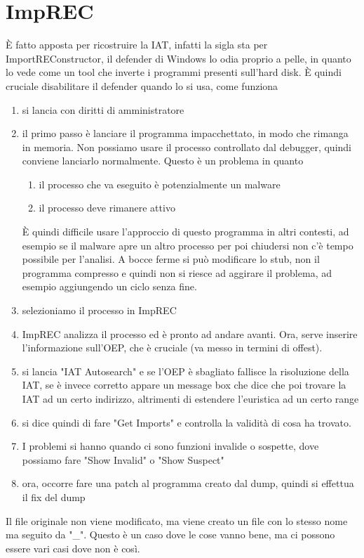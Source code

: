 \documentclass[12pt, oneside]{extbook}
\begin{document}
\section{ImpREC}
È fatto apposta per ricostruire la IAT, infatti la sigla sta per ImportREConstructor, il defender di Windows lo odia proprio a pelle, in quanto lo vede come un tool che inverte i programmi presenti sull'hard disk. È quindi cruciale disabilitare il defender quando lo si usa, come funziona
\begin{enumerate}
\item si lancia con diritti di amministratore
\item il primo passo è lanciare il programma impacchettato, in modo che rimanga in memoria. Non possiamo usare il processo controllato dal debugger, quindi conviene lanciarlo normalmente. Questo è un problema in quanto
\begin{enumerate}
\item il processo che va eseguito è potenzialmente un malware
\item il processo deve rimanere attivo
\end{enumerate}
È quindi difficile usare l'approccio di questo programma in altri contesti, ad esempio se il malware apre un altro processo per poi chiudersi non c'è tempo possibile per l'analisi. A bocce ferme si può modificare lo stub, non il programma compresso e quindi non si riesce ad aggirare il problema, ad esempio aggiungendo un ciclo senza fine.
\item selezioniamo il processo in ImpREC
\item ImpREC analizza il processo ed è pronto ad andare avanti. Ora, serve inserire l'informazione sull'OEP, che è cruciale (va messo in termini di offest).
\item si lancia "IAT Autosearch" e se l'OEP è sbagliato fallisce la risoluzione della IAT, se è invece corretto appare un message box che dice che poi trovare la IAT ad un certo indirizzo, altrimenti di estendere l'euristica ad un certo range
\item si dice quindi di fare "Get Imports" e controlla la validità di cosa ha trovato.
\item I problemi si hanno quando ci sono funzioni invalide o sospette, dove possiamo fare "Show Invalid" o "Show Suspect"
\item ora, occorre fare una patch al programma creato dal dump, quindi si effettua il fix del dump
\end{enumerate}
Il file originale non viene modificato, ma viene creato un file con lo stesso nome ma seguito da "\_". Questo è un caso dove le cose vanno bene, ma ci possono essere vari casi dove non è così.
\end{document}
